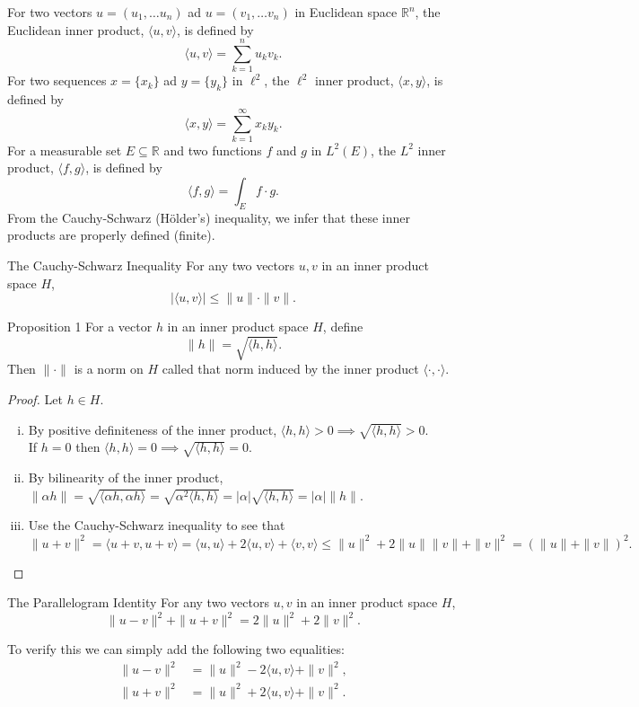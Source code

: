 For two vectors $u=(u_1,\dots u_n)$ ad $u=(v_1,\dots v_n)$ in Euclidean space $\mathbb{R}^n$, the Euclidean inner product, $\langle u,v\rangle$, is defined by
\[
    \langle u,v\rangle=\sum_{k=1}^nu_kv_k.
\]
For two sequences $x=\{x_k\}$ ad $y=\{y_k\}$ in $\ell^2$, the $\ell^2$ inner product, $\langle x,y \rangle$, is defined by
\[
    \langle x,y\rangle=\sum_{k=1}^\infty x_ky_k.
\]
For a measurable set $E\subseteq\mathbb{R}$ and two functions $f$ and $g$ in $L^2(E)$, the $L^2$ inner product, $\langle f,g \rangle$, is defined by
\[
    \langle f,g\rangle=\int_Ef\cdot g.
\]
From the Cauchy-Schwarz (H\"older's) inequality, we infer that these inner products are properly defined (finite).
\begin{namedthm*}{The Cauchy-Schwarz Inequality}
    For any two vectors $u,v$ in an inner product space $H$,
    \[
        |\langle u,v\rangle|\le\|u\|\cdot\|v\|.
    \]
\end{namedthm*}
\begin{namedthm*}{Proposition 1}
    For a vector $h$ in an inner product space $H$, define
    \[
        \|h\|=\sqrt{\langle h,h\rangle}.
    \]
    Then $\|\cdot\|$ is a norm on $H$ called that norm induced by the inner product $\langle\cdot,\cdot\rangle$.
\end{namedthm*}
\begin{proof}
    Let $h\in H$.
    \begin{enumerate}[(i)]
        \item By positive definiteness of the inner product, $\langle h,h\rangle>0\implies \sqrt{\langle h,h\rangle}>0$.
        \\If $h=0$ then $\langle h,h\rangle=0\implies\sqrt{\langle h,h\rangle}=0$.
        \item By bilinearity of the inner product, $\|\alpha h\|=\sqrt{\langle \alpha h,\alpha h\rangle}=\sqrt{\alpha^2\langle h,h\rangle}=|\alpha|\sqrt{\langle h,h\rangle} =|\alpha|\|h\|$.
        \item Use the Cauchy-Schwarz inequality to see that 
        \[
            \|u+v\|^2=\langle u+v,u+v\rangle=\langle u,u\rangle+2\langle u,v\rangle+\langle v,v\rangle\le \|u\|^2+2\|u\|\|v\|+\|v\|^2=(\|u\|+\|v\|)^2.
        \]
    \end{enumerate}
\end{proof}
\begin{namedthm*}{The Parallelogram Identity}
    For any two vectors $u,v$ in an inner product space $H$,
    \[
        \|u-v\|^2+\|u+v\|^2=2\|u\|^2+2\|v\|^2.
    \]
\end{namedthm*}
To verify this we can simply add the following two equalities:
\begin{align*}
    \|u-v\|^2&=\|u\|^2-2\langle u,v\rangle+\|v\|^2,\\
    \|u+v\|^2&=\|u\|^2+2\langle u,v\rangle+\|v\|^2.
\end{align*}

